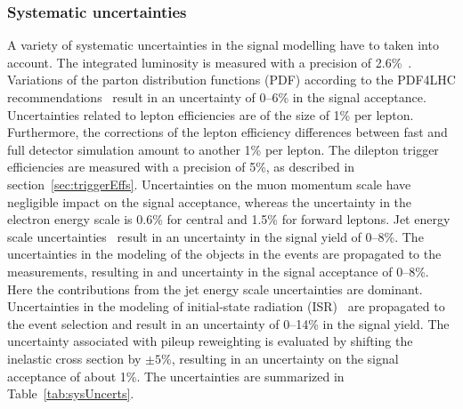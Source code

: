 \subsubsection{Systematic uncertainties}
A variety of systematic uncertainties in the signal modelling have to taken into account. The integrated luminosity is measured with a precision of 2.6\%~\cite{CMS-PAS-LUM-13-001}. Variations of the parton distribution functions (PDF) according to the PDF4LHC recommendations~\cite{Alekhin:2011sk,Botje:2011sn,Ball:2012cx,Martin:2009iq,Lai:2010vv} result in an uncertainty of 0--6\% in the signal acceptance. Uncertainties related to lepton efficiencies are of the size of 1\% per lepton. Furthermore, the corrections of the lepton efficiency differences between fast and full detector simulation amount to another 1\% per lepton. The dilepton trigger efficiencies are measured with a precision of 5\%, as described in section~\ref{sec:triggerEffs}. Uncertainties on the muon momentum scale have negligible impact on the signal acceptance, whereas the uncertainty in the electron energy scale is 0.6\% for central and 1.5\% for forward leptons. Jet energy scale uncertainties~\cite{1748-0221-6-11-P11002} result in an uncertainty in the signal yield of 0--8\%. The uncertainties in the modeling of the objects in the events are propagated to the \MET measurements, resulting in and uncertainty in the signal acceptance of 0--8\%. Here the contributions from the jet energy scale uncertainties are dominant. 
Uncertainties in the modeling of initial-state radiation (ISR)~\cite{Chatrchyan:2013xna} are propagated to the event selection and result in an uncertainty of 0--14\% in the signal yield.
The uncertainty associated with pileup reweighting is evaluated by shifting the inelastic cross section by $\pm5\%$, resulting in an uncertainty on the signal acceptance of about 1\%. The uncertainties are summarized in Table~\ref{tab:sysUncerts}.

